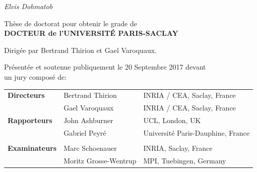\documentclass[nobib, a4paper, notoc, twoside, justified, openany]{tufte-book}
\begin{document}
\begin{titlepage}
\begin{fullwidth}
\begin{center}


\vspace{3pc}
{\Huge \it Elvis Dohmatob} \\

\vspace{3pc}



{\LARGE Thèse de doctorat pour obtenir le grade de \ \\[1ex]
{\bf DOCTEUR de l'UNIVERSIT\'E PARIS-SACLAY} \ \\
}
\vspace{1pc}

{\LARGE Dirig\'ee par {Bertrand Thirion} et {Gael Varoquaux}.}

\vspace{1pc}


{\LARGE Présentée et soutenue publiquement le 20 Septembre 2017 devant \\ \vspace{10pt} un jury composé de:}

\vspace{1pc}

{\LARGE
\begin{tabular}{lll}
\vspace{1pc}
\textbf{Directeurs} & Bertrand Thirion & INRIA / CEA, Saclay, France \\
\vspace{1pc}
 & Gael Varoquaux & INRIA / CEA, Saclay, France \\
\vspace{1pc}
  \textbf{Rapporteurs} & John Ashburner  & UCL, London, UK  \\
  \vspace{1pc}  
& Gabriel Peyr\'e  & Universit\'e Paris-Dauphine, France  \\  \\
  \vspace{1pc}
\textbf{Examinateurs} & Marc Schoenauer & INRIA,  Saclay, France \\
  \vspace{1pc}
 & Moritz Grosse-Wentrup  & MPI, Tuebingen, Germany \\  
\end{tabular}
}

\end{center}
\end{fullwidth}
\end{titlepage}
\end{document}
